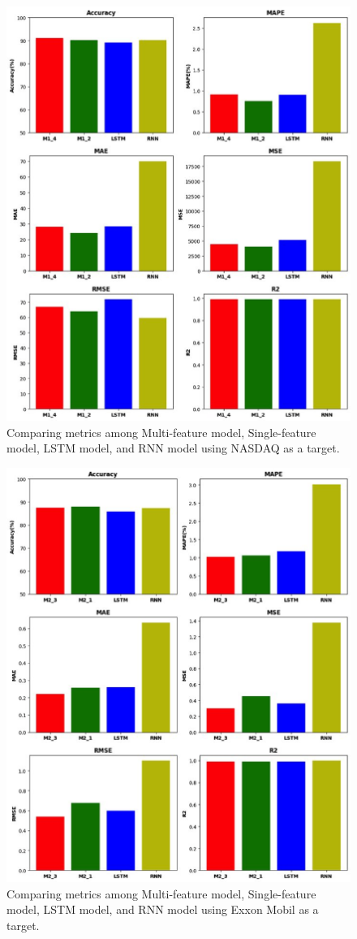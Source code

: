 \begin{figure}[H]
	\centering
	\includegraphics[width=1\linewidth]{images/nasdaq.eps}
	\caption{Comparing metrics among Multi-feature model, Single-feature model,
		LSTM model, and RNN model using NASDAQ as a target.}
	\label{fig:compare1}
\end{figure}

\begin{figure}[H]
	\centering
	\includegraphics[width=1\linewidth]{images/exxon.eps}
	\caption{Comparing metrics among Multi-feature model, Single-feature model,
		LSTM model, and RNN model using Exxon Mobil as a target.}
	\label{fig:compare2}
\end{figure}